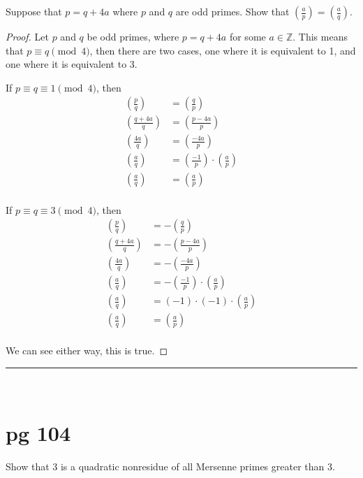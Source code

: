 \documentclass[11pt]{article}
\newcommand{\Z}{\mathbb{Z}}
\newcommand\leg[2]{\left(\frac{#1}{#2}\right)}
\newenvironment{problem}[2][Problem]{\begin{trivlist}
\item[\hskip \labelsep {\bfseries #1}\hskip \labelsep {\bfseries #2.}]}{\end{trivlist}}
\begin{document}
\begin{problem}{20}
Suppose that $p=q+4a$ where $p$ and $q$ are odd primes. Show that $\leg{a}{p}=\leg{a}{q}$.
\end{problem}

\begin{proof}
  Let $p$ and $q$ be odd primes, where $p=q+4a$ for some $a\in \Z$. This means that $p\equiv q \pmod{4}$, then there are two cases, one where it is equivalent to 1, and one where it is equivalent to 3.

  If $p\equiv q \equiv 1\pmod{4}$, then
  \begin{align*}
    \leg{p}{q}    & = \leg{q}{p}                  \\
    \leg{q+4a}{q} & = \leg{p-4a}{p}               \\
    \leg{4a}{q}   & = \leg{-4a}{p}                \\
    \leg{a}{q}    & = \leg{-1}{p}\cdot \leg{a}{p} \\
    \leg{a}{q}    & = \leg{a}{p}                  \\
  \end{align*}

  If $p\equiv q \equiv 3\pmod{4}$, then
  \begin{align*}
    \leg{p}{q}    & = -\leg{q}{p}                    \\
    \leg{q+4a}{q} & = -\leg{p-4a}{p}                 \\
    \leg{4a}{q}   & = -\leg{-4a}{p}                  \\
    \leg{a}{q}    & = -\leg{-1}{p}\cdot \leg{a}{p}   \\
    \leg{a}{q}    & = (-1)\cdot (-1)\cdot \leg{a}{p} \\
    \leg{a}{q}    & = \leg{a}{p}                     \\
  \end{align*}

  We can see either way, this is true.
\end{proof}

\hrule
~\newline

\section{pg 104}

\begin{problem}{2}
Show that 3 is a quadratic nonresidue of all Mersenne primes greater than 3.
\end{problem}
\end{document}
